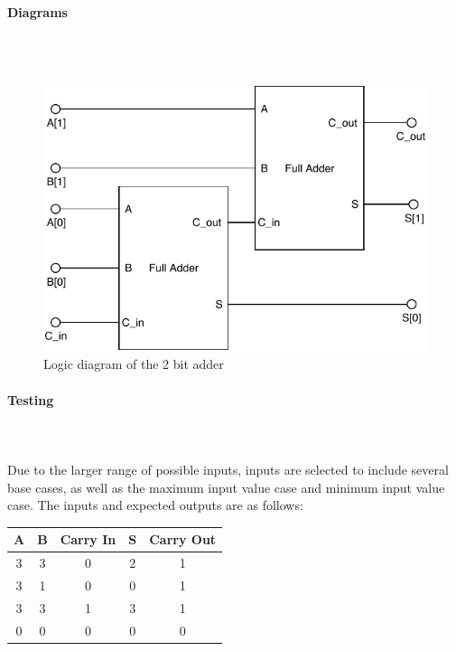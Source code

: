\documentclass{article}
\begin{document}
    \paragraph{Diagrams}
    \hfill\\\\
    \begin{figure}[H]
        \centering
        \includegraphics{../diagrams/alu/adder/adder_2.pdf}
        \caption{Logic diagram of the 2 bit adder}
    \end{figure}

    \paragraph{Testing}
    \hfill\\\\
    Due to the larger range of possible inputs, inputs are selected to include
    several base cases, as well as the maximum input value case and minimum
    input value case. The inputs and expected outputs are as follows:

    \begin{center}
        \begin{tabular}{|c|c|c||c|c|}
            \hline
            A & B & Carry In & S & Carry Out
            \\\hline\hline
            3 & 3 & 0 & 2 & 1
            \\\hline\hline
            3 & 1 & 0 & 0 & 1
            \\\hline\hline
            3 & 3 & 1 & 3 & 1
            \\\hline\hline
            0 & 0 & 0 & 0 & 0
            \\\hline
        \end{tabular}
    \end{center}
\end{document}
